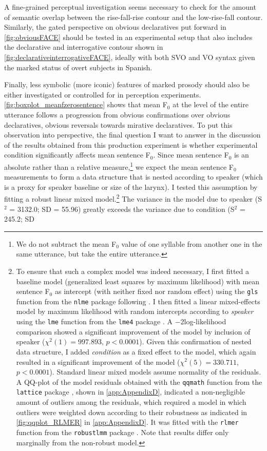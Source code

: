 A fine-grained perceptual investigation seems necessary to check for the a\-mount of semantic overlap between the rise-fall-rise contour and the low-rise-fall contour. Similarly, the gated perspective on obvious declaratives put forward in \autoref{fig:obviousFACE} should be tested in an experimental setup that also includes the declarative and interrogative contour shown in \autoref{fig:declarativeinterrogativeFACE}, ideally with both SVO and VO syntax given the marked status of overt subjects in Spanish. 

Finally, less symbolic (more iconic) features of marked prosody should also be either investigated or controlled for in perception experiments. \autoref{fig:boxplot_meanfzerosentence} shows that mean F$_0$ at the level of the entire utterance follows a progression from obvious confirmations over obvious declaratives, obvious reversals towards mirative declaratives. To put this observation into perspective, the final question I want to answer in the discussion of the results obtained from this production experiment is whether experimental condition significantly affects mean sentence F$_0$. Since mean sentence F$_0$ is an absolute rather than a relative measure,\footnote{We do not subtract the mean F$_0$ value of one syllable from another one in the same utterance, but take the entire utterance.} we expect the mean sentence F$_0$ measurements to form a data structure that is nested according to speaker (which is a proxy for speaker baseline or size of the larynx). I tested this assumption by fitting a robust linear mixed model.\footnote{To ensure that such a complex model was indeed necessary, I first fitted a baseline model (generalized least squares by maximum likelihood) with mean sentence F$_0$ as intercept (with neither fixed nor random effect) using the \texttt{gls} function from the \texttt{nlme} package \citep{PinheiroBatesDebRoySarkar.2020} following \citet[895--896]{FieldMilesField.2012}. I then fitted a linear mixed-effects model by maximum likelihood with random intercepts according to \textit{speaker} using the \texttt{lme} function from the \texttt{lme4} package \citep{BatesMachlerBolkerWalker.2015}. A $-$2log-likelihood comparison showed a significant improvement of the model by inclusion of speaker ($\chi^2(1) = 997.893$, $p<0.0001$). Given this confirmation of nested data structure, I added \textit{condition} as a fixed effect to the model, which again resulted in a significant improvement of the model ($\chi^2(5) = 330.711$, $p<0.0001$). Standard linear mixed models assume normality of the residuals. A QQ-plot of the model residuals obtained with the \texttt{qqmath} function from the \texttt{lattice} package \citep{Sarkar.2008}, shown in \autoref{app:AppendixD}, indicated a non-negli\-gi\-ble amount of outliers among the residuals, which required a model in which outliers were weighted down according to their robustness as indicated in \autoref{fig:qqplot_RLMER} in \autoref{app:AppendixD}. It was fitted with the \texttt{rlmer} function from the \texttt{robustlmm} package \citep{Koller.2016}. Note that results differ only marginally from the non-robust model.} The variance in the model due to speaker (S$^2$ = 3132.0; SD = 55.96) greatly exceeds the variance due to condition (S$^2$ = 245.2; SD 